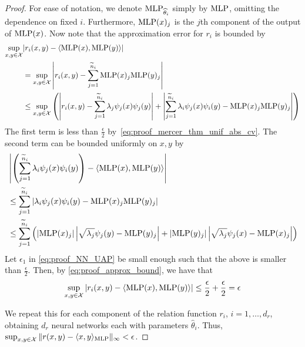 \begin{proof}
	For ease of notation, we denote \(\text{MLP}_{\widehat{\theta}_i}\) simply by \(\text{MLP}\), omitting the dependence on fixed \(i\). Furthermore, \(\text{MLP}(x)_j\) is the \(j\)th component of the output of \(\text{MLP}(x)\). Now note that the approximation error for \(r_i\) is bounded by
	\begin{equation}
		\label{eq:proof_approx_bound}
		\begin{split}
			\sup_{x, y \in \mathcal{X}}&{
				\left\lvert r_i(x,y) - \langle \MLP(x), \MLP(y) \rangle \right\rvert}\\
			&= \sup_{x, y \in \mathcal{X}}{
				\left\lvert r_i(x,y) - \sum_{j=1}^{\tilde{n}_i}{\MLP(x)_j \MLP(y)_j} \right\rvert} \\
			&\leq \sup_{x,y \in \mathcal{X}}{ \left(
				\left\lvert r_i(x,y) - \sum_{j=1}^{\tilde{n}_i}{\lambda_j \psi_j(x) \psi_j(y)} \right\rvert
				+ \left\lvert \sum_{j=1}^{\tilde{n}_i}{\lambda_i \psi_j(x) \psi_i(y) - \MLP(x)_j \MLP(y)_j} \right\rvert  \right) }
		\end{split}
	\end{equation}
	The first term is less than \(\frac{\epsilon}{2}\) by~\eqref{eq:proof_mercer_thm_unif_abs_cv}. The second term can be bounded uniformly on \(x,y\) by
	\begin{equation*}
		\begin{split}
			&\left\lvert \left(\sum_{j=1}^{\tilde{n}_i}{\lambda_i \psi_j(x) \psi_i(y)}\right) - \langle \MLP(x), \MLP(y) \rangle \right\rvert  \\
			&\leq \sum_{j=1}^{\tilde{n}_i}{ \left\lvert \lambda_i \psi_j(x) \psi_i(y) - \MLP(x)_j \MLP(y)_j \right\rvert} \\
			&\leq \sum_{j=1}^{\tilde{n}_i}{\left(
				\left\lvert \MLP(x)_j \right\rvert \left\lvert \sqrt{\lambda_j} \psi_j(y) - \MLP(y)_j \right\rvert
				+ \lvert \MLP(y)_j \rvert \left\lvert \sqrt{\lambda_j} \psi_j(x) - \MLP(x)_j \right\rvert
				\right)}
		\end{split}
	\end{equation*}
	Let \(\epsilon_1\) in \eqref{eq:proof_NN_UAP} be small enough such that the above is smaller than \(\frac{\epsilon}{2}\). 	Then, by \eqref{eq:proof_approx_bound}, we have that
	\begin{equation*}
		\sup_{x, y \in \mathcal{X}}{
			\lvert r_i(x,y) - \langle \MLP(x), \MLP(y) \rangle \rvert} \leq \frac{\epsilon}{2} + \frac{\epsilon}{2} = \epsilon
	\end{equation*}

	We repeat this for each component of the relation function \(r_i\), \(i=1, \ldots, d_r\), obtaining \(d_r\) neural networks each with parameters \(\hat{\theta}_i\). Thus, \(\sup_{x,y \in \mathcal{X}}{\lVert r(x,y) - \langle x, y \rangle_{\text{MLP}} \rVert_\infty} < \epsilon\).
\end{proof}

